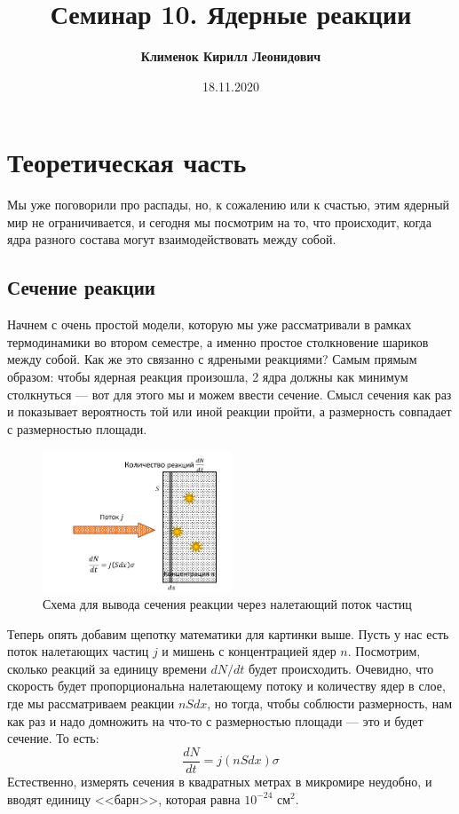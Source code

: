\documentclass[12pt]{article}
\begin{document}
 
\title{\textbf{Семинар 10. Ядерные реакции }}
\author{\textbf{Клименок Кирилл Леонидович}}
\date{18.11.2020}
\maketitle
\section{Теоретическая часть}
Мы уже поговорили про распады, но, к сожалению или к счастью, этим ядерный мир не ограничивается, и сегодня мы посмотрим на то, что происходит, когда ядра разного состава могут взаимодействовать между собой.
\subsection{Сечение реакции}
Начнем с очень простой модели, которую мы уже рассматривали в рамках термодинамики во втором семестре, а именно простое столкновение шариков между собой. Как же это связанно с ядреными реакциями? Самым прямым образом: чтобы ядерная реакция произошла, 2 ядра должны как минимум столкнуться --- вот для этого мы и можем ввести сечение. Смысл сечения как раз и показывает вероятность той или иной реакции пройти, а размерность совпадает с размерностью площади.
\begin{figure}[h]
    \centering
    \includegraphics[width=0.5\textwidth,height=\textheight,keepaspectratio]{Seminar_10/pics/pic_01_sigma.pdf}
    \caption{Схема для вывода сечения реакции через налетающий поток частиц}
    \label{fig:sem_10_sigma}
\end{figure}

Теперь опять добавим щепотку математики для картинки выше. Пусть у нас есть поток налетающих частиц $j$ и мишень с концентрацией ядер $n$. Посмотрим, сколько реакций за единицу времени $dN/dt$ будет происходить. Очевидно, что скорость будет пропорциональна налетающему потоку и количеству ядер в слое, где мы рассматриваем реакции $nSdx$, но тогда, чтобы соблюсти размерность, нам как раз и надо домножить на что-то с размерностью площади --- это и будет сечение. То есть:
\begin{equation*}
    \dfrac{dN}{dt} = j (nSdx) \sigma
\end{equation*}
Естественно, измерять сечения в квадратных метрах в микромире неудобно, и вводят единицу <<барн>>, которая равна $10^{-24}$ $\text{см}^2$.
\end{document}
